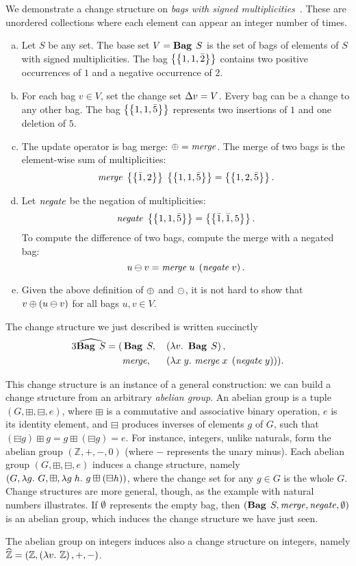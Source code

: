 \begin{examples}
We demonstrate a change structure on \emph{bags with signed
multiplicities}~\citep{Koch10IQE}.
These are
unordered collections where each element can appear an integer
number of times. 
\begin{enumerate}[(a)]
\item
Let $S$ be any set.
The base set $V=\Bag S$ is the set of bags of elements of $S$ with signed
multiplicities. The bag $\left\lbrace\left\lbrace1,1,\bar2\right\rbrace\right\rbrace$ contains two positive
occurrences of $1$ and a negative occurrence of $2$.

\item For each bag $v\in V$, set the change set $\Change v = V$.
Every bag can be a change to any other bag. The bag
$\left\lbrace\left\lbrace1,1,\bar5\right\rbrace\right\rbrace$ represents two insertions of $1$ and one
deletion of $5$.

\item The update operator is bag merge: $\UPDATE=\MERGE$. The
merge of two bags is the element-wise sum of multiplicities:
\[
\Merge{\Set{\bar1,2}}{\Set{1,1,\bar5}}=\Set{1,2,\bar5}.
\]

\item Let $\mathit{negate}$ be the negation of multiplicities:
\[
\Negate{\Set{1,1,\bar5}}=\Set{\bar1,\bar1,5}.
\]
To compute the
difference of two bags, compute the merge with a negated bag:
\[
\Diff{u}{v}=\Merge{u}{\Negate*{v}}.
\]

\item Given the above definition of $\UPDATE$ and $\DIFF$, it is
not hard to show that $\Apply{\Diff*{u}{v}}{v}$ for all bags
$u,v\in V$.
\end{enumerate}
The change structure we just described is written succinctly
\begin{alignat*}3
\ChangeStruct{\Bag S} = (
&\Bag S,
&&\Lam*{v} {\Bag S},
\\
&\MERGE,
&&\Lam*{x\; y}{\Merge{x}{\Negate*{y}}}).
\end{alignat*}

This change structure is an instance of a general construction:
we can build a change structure from an arbitrary \emph{abelian group}.
An abelian group is a tuple $(G, \boxplus,
\boxminus, e)$, where $\boxplus$ is a commutative
and associative binary operation, $e$ is its identity
element, and $\boxminus$ produces inverses of elements $g$
of $G$, such that $(\boxminus g) \boxplus g = g \boxplus
(\boxminus g) = e$. For instance, integers,
unlike naturals, form the abelian group $(\mathbb{Z}, +, -, 0)$
(where $-$ represents the unary minus). Each abelian group
$(G, \boxplus, \boxminus, e)$ induces a change structure,
namely $\left(G, \Lam{g}{G}, \boxplus, \Lam{g\; h}{g
    \boxplus (\boxminus h)}\right)$, where the change set
for any $g \in G$ is the whole $G$. Change structures
are more general, though, as the example with natural numbers illustrates.
%
If $\Empty$ represents the empty bag, then $(\Bag{S}, \MERGE,
\NEGATE, \Empty)$ is an abelian group, which induces the
change structure we have just seen.

The abelian group on integers induces also a change structure on
integers, namely $\ChangeStruct{\mathbb{Z}} = (\mathbb{Z},
\Lam*{v} {\mathbb{Z}}, +, -)$.
\end{examples}

